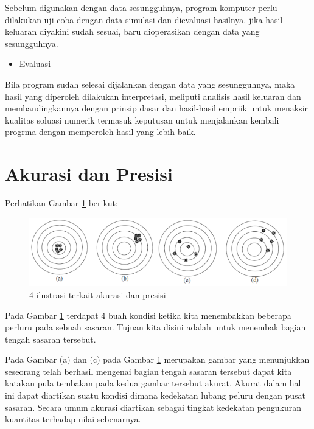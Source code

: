 \documentclass[]{book}
\providecommand{\tightlist}{%
  \setlength{\itemsep}{0pt}\setlength{\parskip}{0pt}}
\theoremstyle{definition}
\theoremstyle{definition}
\theoremstyle{definition}
\theoremstyle{remark}
\begin{document}
Sebelum digunakan dengan data sesungguhnya, program komputer perlu dilakukan uji coba dengan data simulasi dan dievaluasi hasilnya. jika hasil keluaran diyakini sudah sesuai, baru dioperasikan dengan data yang sesungguhnya.

\begin{itemize}
\tightlist
\item
  Evaluasi
\end{itemize}

Bila program sudah selesai dijalankan dengan data yang sesungguhnya, maka hasil yang diperoleh dilakukan interpretasi, meliputi analisis hasil keluaran dan membandingkannya dengan prinsip dasar dan hasil-hasil empriik untuk menaksir kualitas soluasi numerik termasuk keputusan untuk menjalankan kembali progrma dengan memperoleh hasil yang lebih baik.

\hypertarget{acuracy}{%
\section{Akurasi dan Presisi}\label{acuracy}}

Perhatikan Gambar \ref{fig:akurasi} berikut:

\begin{figure}

{\centering \includegraphics[width=0.75\linewidth]{./images/akurasi} 

}

\caption{4 ilustrasi terkait akurasi dan presisi}\label{fig:akurasi}
\end{figure}

Pada Gambar \ref{fig:akurasi} terdapat 4 buah kondisi ketika kita menembakkan beberapa perluru pada sebuah sasaran. Tujuan kita disini adalah untuk menembak bagian tengah sasaran tersebut.

Pada Gambar (a) dan (c) pada Gambar \ref{fig:akurasi} merupakan gambar yang menunjukkan seseorang telah berhasil mengenai bagian tengah sasaran tersebut dapat kita katakan pula tembakan pada kedua gambar tersebut akurat. Akurat dalam hal ini dapat diartikan suatu kondisi dimana kedekatan lubang peluru dengan pusat sasaran. Secara umum akurasi diartikan sebagai tingkat kedekatan pengukuran kuantitas terhadap nilai sebenarnya.
\end{document}
